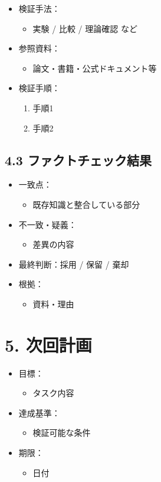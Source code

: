 \documentclass[a4paper,11pt]{ltjsarticle}
\begin{document}
\begin{itemize}
    \item 検証手法：
    \begin{itemize}
        \item 実験 / 比較 / 理論確認 など
    \end{itemize}
    \item 参照資料：
    \begin{itemize}
        \item 論文・書籍・公式ドキュメント等
    \end{itemize}
    \item 検証手順：
    \begin{enumerate}
        \item 手順1
        \item 手順2
    \end{enumerate}
\end{itemize}

\subsection*{4.3 ファクトチェック結果}

\begin{itemize}
    \item 一致点：
    \begin{itemize}
        \item 既存知識と整合している部分
    \end{itemize}
    \item 不一致・疑義：
    \begin{itemize}
        \item 差異の内容
    \end{itemize}
    \item 最終判断：採用 / 保留 / 棄却
    \item 根拠：
    \begin{itemize}
        \item 資料・理由
    \end{itemize}
\end{itemize}

\section{5. 次回計画}

\begin{itemize}
    \item 目標：
    \begin{itemize}
        \item タスク内容
    \end{itemize}
    \item 達成基準：
    \begin{itemize}
        \item 検証可能な条件
    \end{itemize}
    \item 期限：
    \begin{itemize}
        \item 日付
    \end{itemize}
\end{itemize}
\end{document}
